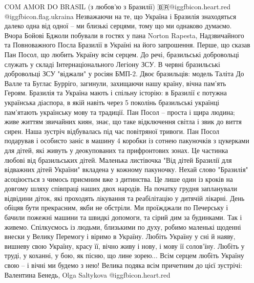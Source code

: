 COM AMOR DO BRASIL (з любов'ю з Бразилії)
🇧🇷@igg{fbicon.heart.red} @igg{fbicon.flag.ukraina}
Незважаючи на те, що Україна і Бразилія знаходяться далеко одна від одної -- ми  близькі серцями, тому що ми однаково думаємо.
Вчора Бойові Бджоли побували в гостях у пана Norton Rapesta, Надзвичайного та Повноважного Посла Бразилії в Україні на його запрошення.
Перше, що сказав Пан Посол, що любить Україну всім серцем.
До речі, бразильські добровольці служать у складі Інтернаціонального Легіону ЗСУ. В червні бразильські добровольці ЗСУ "віджали" у росіян БМП-2. Двоє бразильців: модель Таліта До Валле та Буглас Бурріго, загинули, захищаючи нашу країну, вічна пам'ять Героям.
Бразилія та Україна мають і спільну історію: в Бразилії є потужна українська діаспора, в якій навіть через 5 поколінь бразильські українці пам'ятають українську мову та традиції.
Пан Посол -- проста і щира людина; живе життям звичайних киян, знає, що таке відключення світла і звик до виття сирен.
Наша зустріч відбувалась під час повітряної тривоги.
Пан Посол подарував і особисто заніс в машину 4 коробки із сотнею пакуночків з цукерками для дітей, які живуть у деокупованих та прифронтових зонах. Це частинка любові від бразильських дітей. Маленька листівочка "Від дітей Бразилії для відважних дітей України" вкладена у кожному пакуночку. Нехай слово "Бразилія" асоціюється з чимось приємним вже з дитинства.
Це лише один із кроків на довгому шляху співпраці наших двох народів. На початку грудня запланували відвідини діток, які проходять лікування  та реабілітацію у  дитячій лікарні. 
День обіцяв бути прекрасним, якби не обстріли. Ми проїжджали по Печерську і бачили пожежні машини та швидкі допомоги, та сірий дим за будинками. 
Так і живемо. Спілкуємось із людьми, близькими по духу, робимо маленькі щоденні внески у Велику Перемогу і віримо в Україну. 
Любіть Україну у сні й наяву,
вишневу свою Україну,
красу її, вічно живу і нову,
і мову її солов'їну.
Любіть у труді, у коханні, у бою,
як пісню, що лине зорею...
Всім серцем любіть Україну свою -- 
і вічні ми будемо з нею!
Велика подяка всім причетним до цієї зустрічі: Валентина Бенедь, Olga Saltykova @igg{fbicon.heart.red}
